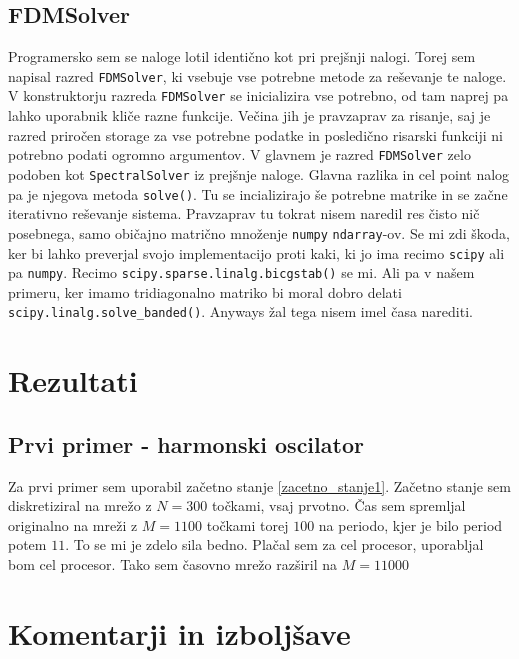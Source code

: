 \documentclass[a4paper]{article}
\begin{document}
\subsection{FDMSolver}
Programersko sem se naloge lotil identično kot pri prejšnji nalogi. Torej sem napisal razred \texttt{FDMSolver},
ki vsebuje vse potrebne metode za reševanje te naloge. V konstruktorju razreda \texttt{FDMSolver} se inicializira
vse potrebno, od tam naprej pa lahko uporabnik kliče razne funkcije. Večina jih je pravzaprav za risanje, saj je 
razred priročen storage za vse potrebne podatke in posledično risarski funkciji ni potrebno podati ogromno argumentov.
V glavnem je razred \texttt{FDMSolver} zelo podoben kot \texttt{SpectralSolver} iz prejšnje naloge. Glavna razlika
in cel point nalog pa je njegova metoda \texttt{solve()}. Tu se incializirajo še potrebne matrike in se začne iterativno
reševanje sistema. Pravzaprav tu tokrat nisem naredil res čisto nič posebnega, samo običajno matrično množenje
\texttt{numpy} \texttt{ndarray}-ov. Se mi zdi škoda, ker bi lahko preverjal svojo implementacijo proti kaki, ki jo 
ima recimo \texttt{scipy} ali pa \texttt{numpy}. Recimo \texttt{scipy.sparse.linalg.bicgstab()} se mi. Ali pa v našem
primeru, ker imamo tridiagonalno matriko bi moral dobro delati \texttt{scipy.linalg.solve\_banded()}. 
Anyways žal tega nisem imel časa narediti.\\

\section{Rezultati}
\subsection{Prvi primer - harmonski oscilator}
Za prvi primer sem uporabil začetno stanje \ref{zacetno_stanje1}. 
Začetno stanje sem diskretiziral na mrežo z $N=300$ točkami, vsaj prvotno. Čas sem spremljal originalno na mreži z 
$M=1100$ točkami torej $100$ na periodo, kjer je bilo period potem $11$. To se mi je zdelo sila bedno. 
Plačal sem za cel procesor, uporabljal bom cel procesor. Tako sem časovno mrežo razširil na $M=11000$ 

\section{Komentarji in izboljšave}


\newpage


\end{document}
